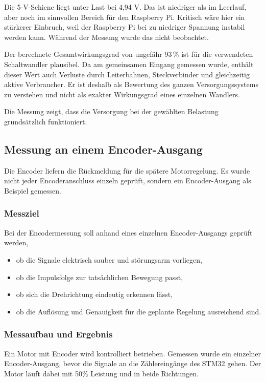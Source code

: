 Die 5-V-Schiene liegt unter Last bei 4,94 V. Das ist niedriger als im Leerlauf, aber noch im sinnvollen Bereich für den Raspberry Pi. Kritisch wäre hier ein stärkerer Einbruch, weil der Raspberry Pi bei zu niedriger Spannung instabil werden kann. Während der Messung wurde das nicht beobachtet.

Der berechnete Gesamtwirkungsgrad von ungefähr 93\,\% ist für die verwendeten Schaltwandler plausibel. Da am gemeinsamen Eingang gemessen wurde, enthält dieser Wert auch Verluste durch Leiterbahnen, Steckverbinder und gleichzeitig aktive Verbraucher. Er ist deshalb als Bewertung des ganzen Versorgungssystems zu verstehen und nicht als exakter Wirkungsgrad eines einzelnen Wandlers.

Die Messung zeigt, dass die Versorgung bei der gewählten Belastung grundsätzlich funktioniert. 

\subsection{Messung an einem Encoder-Ausgang}
Die Encoder liefern die Rückmeldung für die spätere Motorregelung. Es wurde nicht jeder Encoderanschluss einzeln geprüft, sondern ein Encoder-Ausgang als Beispiel gemessen.

\subsubsection{Messziel}
Bei der Encodermessung soll anhand eines einzelnen Encoder-Ausgangs geprüft werden,

\begin{itemize}
	\item ob die Signale elektrisch sauber und störungsarm vorliegen,
	\item ob die Impulsfolge zur tatsächlichen Bewegung passt,
	\item ob sich die Drehrichtung eindeutig erkennen lässt,
	\item ob die Auflösung und Genauigkeit für die geplante Regelung ausreichend sind.
\end{itemize}

\subsubsection{Messaufbau und Ergebnis}
Ein Motor mit Encoder wird kontrolliert betrieben. Gemessen wurde ein einzelner Encoder-Ausgang, bevor die Signale an die Zählereingänge des STM32 gehen. Der Motor läuft dabei mit 50\% Leistung und in beide Richtungen.

